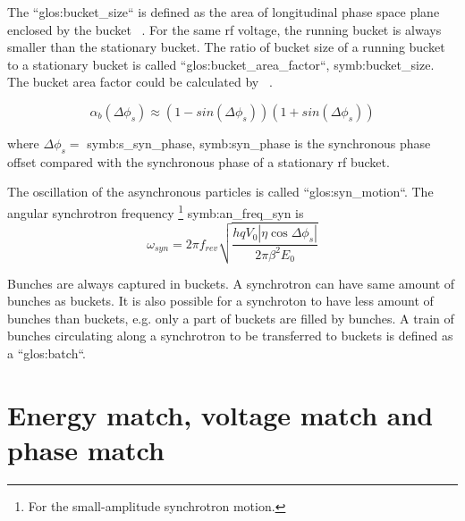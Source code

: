 The ``\gls{glos:bucket_size}`` is defined as the area of longitudinal phase space plane enclosed by the bucket ~\cite{lee_accelerator_2011}. For the same rf voltage, the running bucket is always smaller than the stationary bucket. The ratio of bucket size of a running bucket to a stationary bucket is called ``\gls{glos:bucket_area_factor}``, \gls{symb:bucket_size}. The bucket area factor could be calculated by ~\cite{lee_accelerator_2011}.

\begin{equation}
\alpha_b(\Delta\phi_s)\approx(1-sin(\Delta \phi_s))(1+sin(\Delta \phi_s))
\label{eq:buckt_area_factor}
\end{equation} 

where $\Delta\phi_s=$ \gls{symb:s_syn_phase}, \gls{symb:syn_phase} is the synchronous phase offset compared with the synchronous phase of a stationary rf bucket.


The oscillation of the asynchronous particles is called ``\gls{glos:syn_motion}``. The angular synchrotron frequency \footnote{For the small-amplitude synchrotron motion.} \gls{symb:an_freq_syn} is ~\cite{lee_accelerator_2011}
\begin{equation}
\omega_{\mathit{syn}}=2\pi f_{\mathit{rev}}\sqrt{\frac{hqV_0|\eta\cos\Delta \phi_s|}{2\pi\beta^2E_0}}
\label{eq:synchfreq}
\end{equation} 

Bunches are always captured in buckets. A synchrotron can have same amount of bunches as buckets. It is also possible for a synchroton to have less amount of bunches than buckets, e.g. only a part of buckets are filled by bunches. A train of bunches circulating along a synchrotron to be transferred to buckets is defined as a ``\gls{glos:batch}``.

\section{Energy match, voltage match and phase match}
\label{match}

